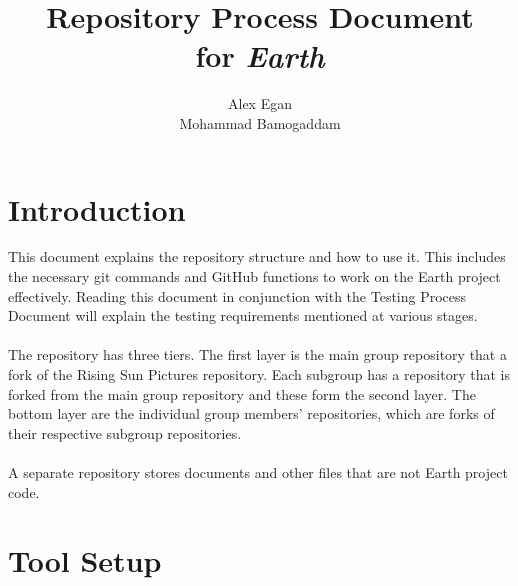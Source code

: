 \documentclass{article}
\begin{document}
\title{\textbf{Repository Process Document}\\for \textit{Earth}}
\author{Alex Egan\\Mohammad Bamogaddam}
\date{ }
\maketitle
{}
\thispagestyle{empty}

\newpage

\thispagestyle{empty}
\tableofcontents

\newpage


\setcounter{page}{1}
\section{Introduction}

This document explains the repository structure and how to use it. This includes the necessary git commands and GitHub functions to work on the Earth project effectively. Reading this document in conjunction with the Testing Process Document will explain the testing requirements mentioned at various stages.\\
\\
The repository has three tiers. The first layer is the main group repository that a fork of the Rising Sun Pictures repository. Each subgroup has a repository that is forked from the main group repository and these form the second layer. The bottom layer are the individual group members' repositories, which are forks of their respective subgroup repositories.\\
\\
A separate repository stores documents and other files that are not Earth project code.


\section{Tool Setup}
\end{document}
